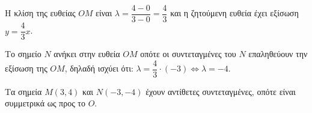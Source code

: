 
\begin{alist}
\item Η κλίση της ευθείας $OM$ είναι $\lambda = \dfrac{4-0}{3-0} = \dfrac{4}{3}$ και η ζητούμενη ευθεία έχει εξίσωση $y = \dfrac{4}{3}x$.

\item 
\begin{rlist}
\item Το σημείο $N$ ανήκει στην ευθεία $OM$ οπότε οι συντεταγμένες του $N$ επαληθεύουν την εξίσωση της $OM$, δηλαδή ισχύει ότι: $\lambda = \dfrac{4}{3} \cdot (-3) \Leftrightarrow \lambda = -4$.
\item Τα σημεία $M(3, 4)$ και $N(-3, -4)$ έχουν αντίθετες συντεταγμένες, οπότε είναι συμμετρικά ως προς το $O$.
\end{rlist}
\end{alist}

